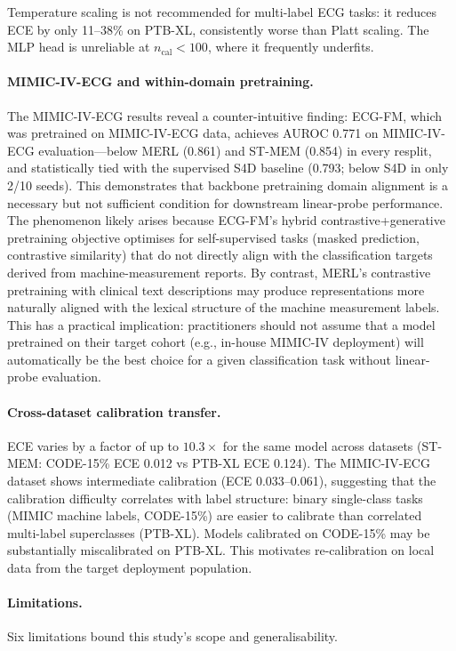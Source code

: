 Temperature scaling is not recommended for multi-label ECG tasks: it reduces ECE by only
11--38\% on PTB-XL, consistently worse than Platt scaling. The MLP head is unreliable
at $n_{\mathrm{cal}} < 100$, where it frequently underfits.

\paragraph{MIMIC-IV-ECG and within-domain pretraining.}
The MIMIC-IV-ECG results reveal a counter-intuitive finding: ECG-FM, which was pretrained
on MIMIC-IV-ECG data, achieves AUROC 0.771 on MIMIC-IV-ECG evaluation---below MERL (0.861)
and ST-MEM (0.854) in every resplit, and statistically tied with the supervised S4D baseline
(0.793; below S4D in only 2/10 seeds). This demonstrates that
backbone pretraining domain alignment is a necessary but not sufficient condition for
downstream linear-probe performance. The phenomenon likely arises because ECG-FM's hybrid
contrastive+generative pretraining objective optimises for self-supervised tasks (masked
prediction, contrastive similarity) that do not directly align with the
classification targets derived from machine-measurement reports. By contrast, MERL's
contrastive pretraining with clinical text descriptions may produce representations
more naturally aligned with the lexical structure of the machine measurement labels.
This has a practical implication: practitioners should not assume that a model pretrained
on their target cohort (e.g., in-house MIMIC-IV deployment) will automatically be the best
choice for a given classification task without linear-probe evaluation.

\paragraph{Cross-dataset calibration transfer.}
ECE varies by a factor of up to $10.3\times$ for the same model across datasets
(ST-MEM: CODE-15\% ECE 0.012 vs PTB-XL ECE 0.124). The MIMIC-IV-ECG dataset shows
intermediate calibration (ECE 0.033--0.061), suggesting that the calibration difficulty
correlates with label structure: binary single-class tasks (MIMIC machine labels, CODE-15\%)
are easier to calibrate than correlated multi-label superclasses (PTB-XL). Models calibrated
on CODE-15\% may be substantially miscalibrated on PTB-XL. This motivates re-calibration
on local data from the target deployment population.

\paragraph{Limitations.}
Six limitations bound this study's scope and generalisability.

